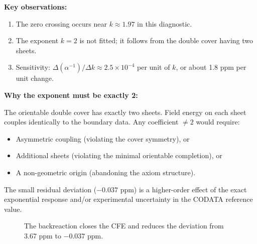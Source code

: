 \textbf{Key observations:}
\begin{enumerate}[leftmargin=1.5em, topsep=2pt, itemsep=1pt]
    \item The zero crossing occurs near $k \approx 1.97$ in this diagnostic.
    \item The exponent $k=2$ is not fitted; it follows from the double cover having two sheets.
    \item Sensitivity: $\Delta(\alpha^{-1})/\Delta k \approx 2.5 \times 10^{-4}$ per unit of $k$, 
        or about 1.8 ppm per unit change.
\end{enumerate}

\textbf{Why the exponent must be exactly 2:}

The orientable double cover has exactly two sheets. Field energy on each sheet couples 
identically to the boundary data. Any coefficient $\neq 2$ would require:
\begin{itemize}[leftmargin=1.5em, topsep=2pt, itemsep=1pt]
    \item Asymmetric coupling (violating the cover symmetry), or
    \item Additional sheets (violating the minimal orientable completion), or
    \item A non-geometric origin (abandoning the axiom structure).
\end{itemize}

The small residual deviation ($-0.037$ ppm) is a higher-order effect of the exact
exponential response and/or experimental uncertainty in the CODATA reference value.

\begin{figure}[H]
\centering
{}
\caption{The backreaction closes the CFE and reduces the deviation from 
3.67 ppm to $-0.037$ ppm.}
\label{fig:deviation}
\end{figure}

